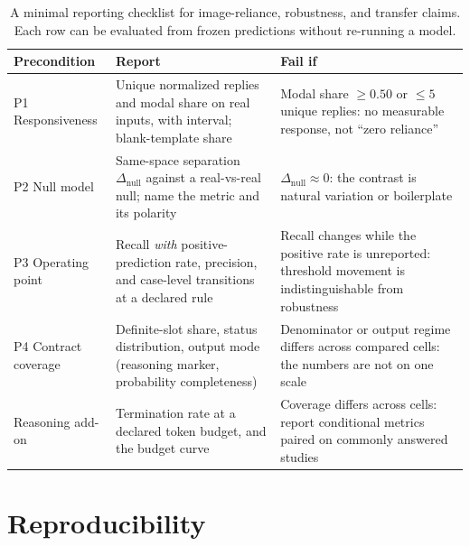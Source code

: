 \begin{table}[h]
\centering
\small
\caption{A minimal reporting checklist for image-reliance, robustness, and transfer claims. Each row can be evaluated from frozen predictions without re-running a model.}
\label{tab:checklist}
\begin{tabular}{p{}p{}p{}}
\toprule
Precondition & Report & Fail if \\
\midrule
P1 Responsiveness & Unique normalized replies and modal share on real inputs, with interval; blank-template share & Modal share $\ge 0.50$ or $\le 5$ unique replies: no measurable response, not ``zero reliance'' \\
P2 Null model & Same-space separation $\Delta_{\text{null}}$ against a real-vs-real null; name the metric and its polarity & $\Delta_{\text{null}} \approx 0$: the contrast is natural variation or boilerplate \\
P3 Operating point & Recall \emph{with} positive-prediction rate, precision, and case-level transitions at a declared rule & Recall changes while the positive rate is unreported: threshold movement is indistinguishable from robustness \\
P4 Contract coverage & Definite-slot share, status distribution, output mode (reasoning marker, probability completeness) & Denominator or output regime differs across compared cells: the numbers are not on one scale \\
\midrule
Reasoning add-on & Termination rate at a declared token budget, and the budget curve & Coverage differs across cells: report conditional metrics paired on commonly answered studies \\
\bottomrule
\end{tabular}
\end{table}

\section*{Reproducibility}

